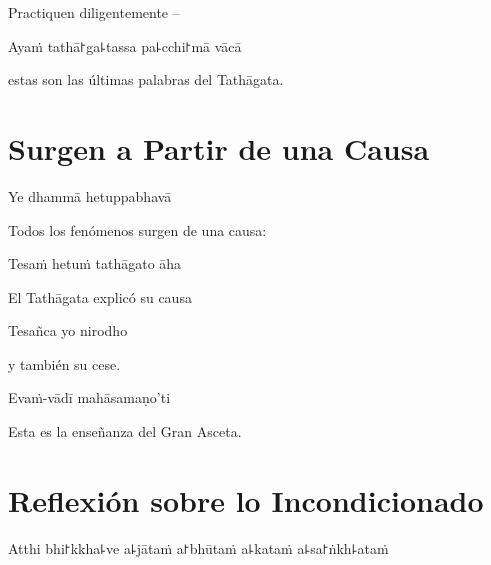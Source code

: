 \begin{english}
  Practiquen diligentemente --
\end{english}

Ayaṁ tathā꜓ga꜕tassa pa꜕cchi꜓mā vācā

\begin{english}
  estas son las últimas palabras del Tathāgata.
\end{english}

\chapter{Surgen a Partir de una Causa}


\begin{leader}
\end{leader}

Ye dhammā hetuppabhavā

\begin{english}
  Todos los fenómenos surgen de una causa:
\end{english}

Tesaṁ hetuṁ tathāgato āha

\begin{english}
  El Tathāgata explicó su causa
\end{english}

Tesañca yo nirodho

\begin{english}
  y también su cese.
\end{english}

Evaṁ-vādī mahāsamaṇo'ti

\begin{english}
  Esta es la enseñanza del Gran Asceta.
\end{english}


\chapter[Incondicionado]{Reflexión sobre lo Incondicionado}


\begin{leader}
\end{leader}

Atthi bhi꜓kkha꜕ve a꜕jātaṁ a꜓bhūtaṁ a꜕kataṁ a꜕sa꜓ṅkh꜕ataṁ

